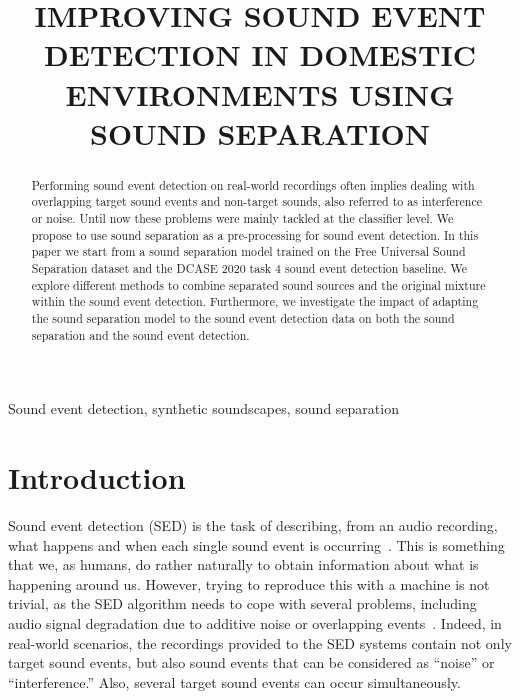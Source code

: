\documentclass{article}
\title{IMPROVING SOUND EVENT DETECTION IN DOMESTIC ENVIRONMENTS USING SOUND SEPARATION}
\begin{document}
\ninept
\maketitle

\begin{sloppy}

\begin{abstract}
Performing sound event detection on real-world recordings often implies dealing with overlapping target sound events and non-target sounds, also referred to as interference or noise. Until now these problems were mainly tackled at the classifier level. We propose to use sound separation as a pre-processing for sound event detection. In this paper we start from a sound separation model trained on the Free Universal Sound Separation dataset and the DCASE 2020 task 4 sound event detection baseline. We explore different methods to combine separated sound sources and the original mixture within the sound event detection. Furthermore, we investigate the impact of adapting the sound separation model to the sound event detection data on both the sound separation and the sound event detection.

\end{abstract}

\begin{keywords}
Sound event detection, synthetic soundscapes, sound separation
\end{keywords}


\section{Introduction}
\label{sec:intro}
Sound event detection (SED) is the task of describing, from an audio recording, what happens and when each single sound event is occurring~\cite{virtanen2018computational}. This is something that we, as humans, do rather naturally to obtain information about what is happening around us. However, trying to reproduce this with a machine is not trivial, as the SED algorithm needs to cope with several problems, including audio signal degradation due to additive noise or overlapping events~\cite{benetos_detection_2016}. Indeed, in real-world scenarios, the recordings provided to the SED systems contain not only target sound events, but also sound events that can be considered as ``noise'' or ``interference.'' Also, several target sound events can occur simultaneously.


\end{sloppy}
\end{document}
